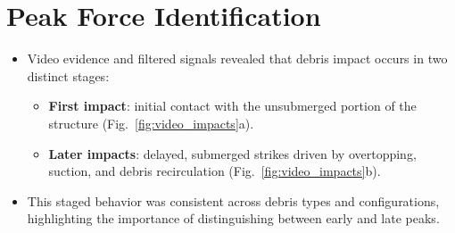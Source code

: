 \documentclass{article}
\begin{document}
\section{Peak Force Identification}
\begin{itemize}
    \item Video evidence and filtered signals revealed that debris impact occurs in two distinct stages:
    \begin{itemize}
        \item \textbf{First impact}: initial contact with the unsubmerged portion of the structure (Fig.~\ref{fig:video_impacts}a).
        \item \textbf{Later impacts}: delayed, submerged strikes driven by overtopping, suction, and debris recirculation (Fig.~\ref{fig:video_impacts}b).
    \end{itemize}
    \item This staged behavior was consistent across debris types and configurations, highlighting the importance of distinguishing between early and late peaks.
\end{itemize}
\end{document}
